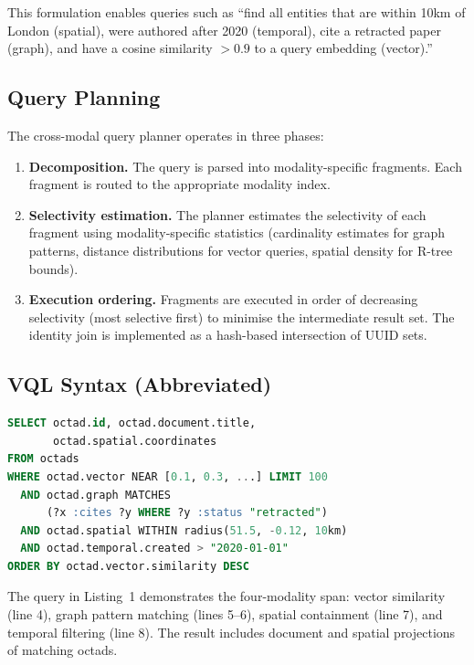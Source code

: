 \documentclass[11pt,twocolumn]{article}
\begin{document}
This formulation enables queries such as ``find all entities that are within
10km of London (spatial), were authored after 2020 (temporal), cite a
retracted paper (graph), and have a cosine similarity $> 0.9$ to a query
embedding (vector).''

\subsection{Query Planning}

The cross-modal query planner operates in three phases:

\begin{enumerate}[leftmargin=*]
  \item \textbf{Decomposition.}  The query is parsed into modality-specific
    fragments.  Each fragment is routed to the appropriate modality index.
  \item \textbf{Selectivity estimation.}  The planner estimates the
    selectivity of each fragment using modality-specific statistics
    (cardinality estimates for graph patterns, distance distributions
    for vector queries, spatial density for R-tree bounds).
  \item \textbf{Execution ordering.}  Fragments are executed in order of
    decreasing selectivity (most selective first) to minimise the
    intermediate result set.  The identity join is implemented as a
    hash-based intersection of UUID sets.
\end{enumerate}

\subsection{VQL Syntax (Abbreviated)}

\begin{lstlisting}[language=SQL,caption={Cross-modal VQL query example}]
SELECT octad.id, octad.document.title,
       octad.spatial.coordinates
FROM octads
WHERE octad.vector NEAR [0.1, 0.3, ...] LIMIT 100
  AND octad.graph MATCHES
      (?x :cites ?y WHERE ?y :status "retracted")
  AND octad.spatial WITHIN radius(51.5, -0.12, 10km)
  AND octad.temporal.created > "2020-01-01"
ORDER BY octad.vector.similarity DESC
\end{lstlisting}

The query in Listing~1 demonstrates the four-modality span: vector similarity
(line 4), graph pattern matching (lines 5--6), spatial containment (line 7),
and temporal filtering (line 8).  The result includes document and spatial
projections of matching octads.
\end{document}
